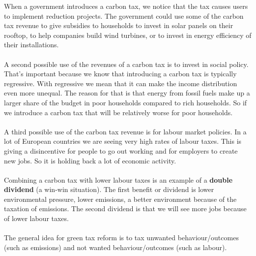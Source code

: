 \documentclass[../summary.tex]{subfiles}
\begin{document}
When a government introduces a carbon tax, we notice that the tax causes users to implement reduction projects. The government could use some of the carbon tax revenue to give subsidies to households to invest in solar panels on their rooftop, to help companies build wind turbines, or to invest in energy efficiency of their installations.
\\\\
A second possible use of the revenues of a carbon tax is to invest in social policy. That's important because we know that introducing a carbon tax is typically regressive. With regressive we mean that it can make the income distribution even more unequal. The reason for that is that energy from fossil fuels make up a larger share of the budget in poor households compared to rich households. So if we introduce a carbon tax that will be relatively worse for poor households.
\\\\
A third possible use of the carbon tax revenue is for labour market policies. In a lot of European countries we are seeing very high rates of labour taxes. This is giving a disincentive for people to go out working and for employers to create new jobs. So it is holding back a lot of economic activity.
\\\\
Combining a carbon tax with lower labour taxes is an example of a \textbf{double dividend} (a win-win situation). The first benefit or dividend is lower environmental pressure, lower emissions, a better environment because of the taxation of emissions. The second dividend is that we will see more jobs because of lower labour taxes.
\\\\
The general idea for green tax reform is to tax unwanted behaviour/outcomes (such as emissions) and not wanted behaviour/outcomes (such as labour).
\newpage
\end{document}
